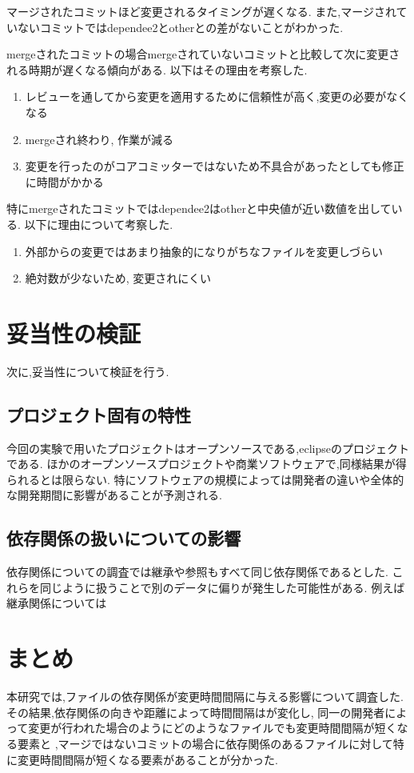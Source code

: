 \documentclass[submit,ses,noauthor]{ipsj} %
\begin{document}
マージされたコミットほど変更されるタイミングが遅くなる.
また,マージされていないコミットではdependee2とotherとの差がないことがわかった.


mergeされたコミットの場合mergeされていないコミットと比較して次に変更される時期が遅くなる傾向がある.
以下はその理由を考察した.
\begin{enumerate}
\item レビューを通してから変更を適用するために信頼性が高く,変更の必要がなくなる
\item mergeされ終わり, 作業が減る
\item 変更を行ったのがコアコミッターではないため不具合があったとしても修正に時間がかかる
\end{enumerate}

特にmergeされたコミットではdependee2はotherと中央値が近い数値を出している.
以下に理由について考察した.

\begin{enumerate}
\item 外部からの変更ではあまり抽象的になりがちなファイルを変更しづらい
\item 絶対数が少ないため, 変更されにくい
\end{enumerate}

\section{妥当性の検証}\label{妥当性の検証}
次に,妥当性について検証を行う.

\subsection{プロジェクト固有の特性}
今回の実験で用いたプロジェクトはオープンソースである,eclipseのプロジェクトである.
ほかのオープンソースプロジェクトや商業ソフトウェアで,同様結果が得られるとは限らない.
特にソフトウェアの規模によっては開発者の違いや全体的な開発期間に影響があることが予測される.

\subsection{依存関係の扱いについての影響}
依存関係についての調査では継承や参照もすべて同じ依存関係であるとした.
これらを同じように扱うことで別のデータに偏りが発生した可能性がある.
例えば継承関係については

\section{まとめ} \label{まとめ}
本研究では,ファイルの依存関係が変更時間間隔に与える影響について調査した.
その結果,依存関係の向きや距離によって時間間隔はが変化し,
同一の開発者によって変更が行われた場合のようにどのようなファイルでも変更時間間隔が短くなる要素と
,マージではないコミットの場合に依存関係のあるファイルに対して特に変更時間間隔が短くなる要素があることが分かった.
\end{document}
